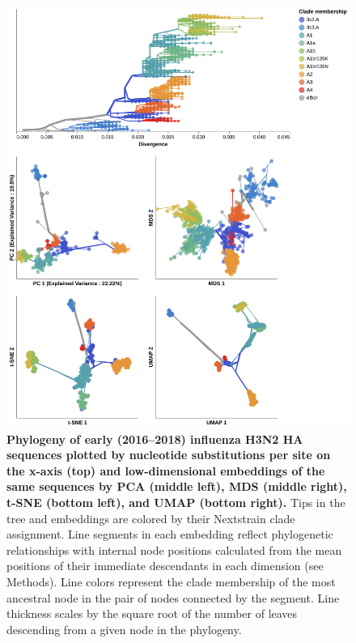 \documentclass[10pt,letterpaper]{article}
\begin{document}
\begin{figure}[!h]
\includegraphics[width=\columnwidth]{figures/flu-2016-2018-ha-embeddings-by-clade.png}
\caption{{\bf Phylogeny of early (2016--2018) influenza H3N2 HA sequences plotted by nucleotide substitutions per site on the x-axis (top) and low-dimensional embeddings of the same sequences by PCA (middle left), MDS (middle right), t-SNE (bottom left), and UMAP (bottom right).}
  Tips in the tree and embeddings are colored by their Nextstrain clade assignment.
  Line segments in each embedding reflect phylogenetic relationships with internal node positions calculated from the mean positions of their immediate descendants in each dimension (see Methods).
  Line colors represent the clade membership of the most ancestral node in the pair of nodes connected by the segment.
  Line thickness scales by the square root of the number of leaves descending from a given node in the phylogeny.
}
\label{fig:seasonal-influenza-h3n2-ha-embeddings}
\end{figure}
\end{document}

